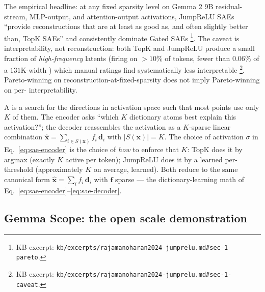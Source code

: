 The empirical headline: at any fixed sparsity level on Gemma 2 9B
residual-stream, MLP-output, and attention-output activations, JumpReLU
SAEs ``provide reconstructions that are at least as good as, and often
slightly better than, TopK SAEs'' and consistently dominate Gated SAEs
\citep[\S 1]{rajamanoharan2024-jumprelu}\footnote{KB excerpt:
\nolinkurl{kb/excerpts/rajamanoharan2024-jumprelu.md#sec-1-pareto}.}. The
caveat is interpretability, not reconstruction: both TopK and JumpReLU
produce a small fraction of \emph{high-frequency} latents (firing on
$>10\%$ of tokens, fewer than $0.06\%$ of a $131$K-width ) which
manual ratings find systematically less interpretable
\citep[\S 1]{rajamanoharan2024-jumprelu}\footnote{KB excerpt:
\nolinkurl{kb/excerpts/rajamanoharan2024-jumprelu.md#sec-1-caveat}.}.
Pareto-winning on reconstruction-at-fixed-sparsity does not imply
Pareto-winning on per- interpretability.

\begin{intuition}
A  is a search for the directions in activation space
such that most points use only $K$ of them. The encoder asks ``which
$K$ dictionary atoms best explain this activation?''; the decoder
reassembles the activation as a $K$-sparse linear combination
$\hat{\mathbf{x}} = \sum_{i \in S(\mathbf{x})} f_i\,\mathbf{d}_i$ with
$|S(\mathbf{x})| = K$. The choice of activation $\sigma$ in
Eq.~\eqref{eq:sae-encoder} is the choice of \emph{how} to enforce that
$K$: TopK does it by argmax (exactly $K$ active per token); JumpReLU
does it by a learned per- threshold (approximately $K$ on
average, learned). Both reduce to the same canonical form
$\hat{\mathbf{x}} = \sum_i f_i\,\mathbf{d}_i$ with $\mathbf{f}$
sparse --- the dictionary-learning math of
Eq.~\eqref{eq:sae-encoder}--\eqref{eq:sae-decoder}.
\end{intuition}

\subsection{Gemma Scope: the open scale demonstration}
\label{sec:sae-gemma-scope}

